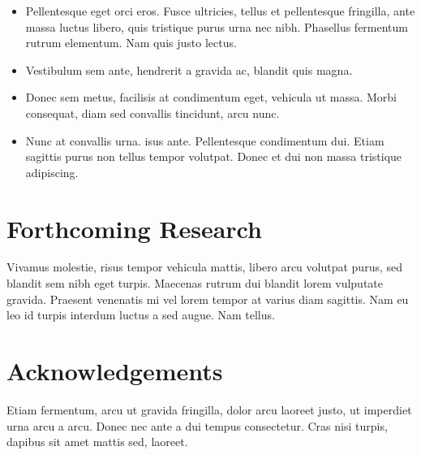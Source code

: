 \documentclass[a0,landscape]{a0poster}
\begin{document}
\begin{multicols}{4}
\begin{itemize}
\item Pellentesque eget orci eros. Fusce ultricies, tellus et pellentesque fringilla, ante massa luctus libero, quis tristique purus urna nec nibh. Phasellus fermentum rutrum elementum. Nam quis justo lectus.
\item Vestibulum sem ante, hendrerit a gravida ac, blandit quis magna.
\item Donec sem metus, facilisis at condimentum eget, vehicula ut massa. Morbi consequat, diam sed convallis tincidunt, arcu nunc.
\item Nunc at convallis urna. isus ante. Pellentesque condimentum dui. Etiam sagittis purus non tellus tempor volutpat. Donec et dui non massa tristique adipiscing.
\end{itemize}

\color{DarkSlateGray} %


\section*{Forthcoming Research}

Vivamus molestie, risus tempor vehicula mattis, libero arcu volutpat purus, sed blandit sem nibh eget turpis. Maecenas rutrum dui blandit lorem vulputate gravida. Praesent venenatis mi vel lorem tempor at varius diam sagittis. Nam eu leo id turpis interdum luctus a sed augue. Nam tellus.


\nocite{*} %


\section*{Acknowledgements}

Etiam fermentum, arcu ut gravida fringilla, dolor arcu laoreet justo, ut imperdiet urna arcu a arcu. Donec nec ante a dui tempus consectetur. Cras nisi turpis, dapibus sit amet mattis sed, laoreet.


\end{multicols}
\end{document}
